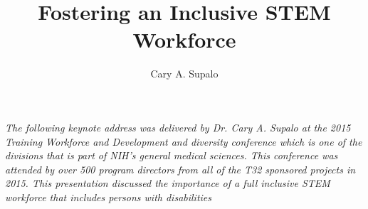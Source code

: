 \documentclass[11.5pt]{sig-alternate} %
\makeatletter
\let\oldabstract\abstract
\let\oldendabstract\endabstract
\renewenvironment{abstract} %
{\renewenvironment{quotation}%
               {\list{}{\addtolength{\leftmargin}{1em} %
                        \listparindent 1.5em%
                        \itemindent    \listparindent%
                        \rightmargin   \leftmargin%
                        \parsep        \z@ \@plus\p@}%
                \item\relax}%
               {\endlist}%
\oldabstract}
{\oldendabstract}
\makeatother
\begin{document}
\title{Fostering an Inclusive STEM Workforce}

\author[1]{\large \color{blue}Cary A. Supalo }


\toappear{}
\maketitle
\begin{@twocolumnfalse} 
\begin{abstract}
\item 
\textit {The following keynote address was delivered by Dr. Cary A. Supalo at the 2015 Training Workforce and Development and diversity conference which is one of the divisions that is part of NIH’s general medical sciences. This conference was attended by over 500 program directors from all of the T32 sponsored projects in 2015. This presentation discussed the importance of a full inclusive STEM workforce that includes persons with disabilities}
\\ \\
\end{abstract}
\end{@twocolumnfalse}

\end{document}
